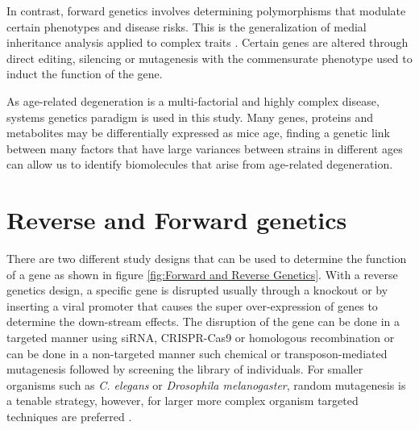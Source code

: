 \documentclass[a4paper,11pt,twoside]{book}
\begin{document}
	In contrast, forward genetics involves determining polymorphisms that modulate certain phenotypes and disease risks. This is the generalization of medial inheritance analysis applied to complex traits \citep{Williams2015TheAnalysis}. Certain genes are altered through direct editing, silencing or mutagenesis with the commensurate phenotype used to induct the function of the gene. 
	
	As age-related degeneration is a multi-factorial and highly complex disease, systems genetics paradigm is used in this study. Many genes, proteins and metabolites may be differentially expressed as mice age, finding a genetic link between many factors that have large variances between strains in different ages can allow us to identify biomolecules that arise from age-related degeneration.
		
	\section{Reverse and Forward genetics}
	
	There are two different study designs that can be used to determine the function of a gene as shown in figure \ref{fig:Forward and Reverse Genetics}. With a reverse genetics design, a specific gene is disrupted usually through a knockout or by inserting a viral promoter that causes the super over-expression of genes to determine the down-stream effects. The disruption of the gene can be done in a targeted manner using siRNA, CRISPR-Cas9 or homologous recombination or can be done in a non-targeted manner such chemical or transposon-mediated mutagenesis followed by screening the library of individuals\citep{MelindaB.TierneyandKurtH.Lamour2005}. For smaller organisms such as  \textit{C. elegans} or \textit{Drosophila melanogaster}, random mutagenesis is a tenable strategy, however, for larger more complex organism targeted techniques are preferred \citep{MelindaB.TierneyandKurtH.Lamour2005}.
		
\end{document}
